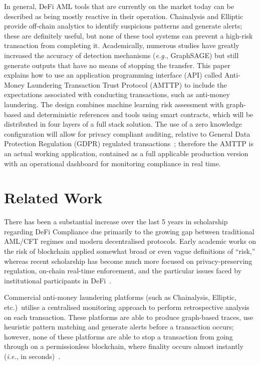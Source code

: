 \documentclass[journal]{IEEEtran}
\newcommand{\ie}{\textit{i.e.}}
\newcommand{\eg}{\textit{e.g.}}
\begin{document}
In general, DeFi AML tools that are currently on the market today can be described as being mostly reactive in their operation. Chainalysis and Elliptic provide off-chain analytics to identify suspicious patterns and generate alerts; these are definitely useful, but none of these tool systems can prevent a high-risk transaction from completing it. Academically, numerous studies have greatly increased the accuracy of detection mechanisms (\eg, GraphSAGE) but still generate outputs that have no means of stopping the transfer. This paper explains how to use an application programming interface (API) called Anti-Money Laundering Transaction Trust Protocol (AMTTP) to include the expectations associated with conducting transactions, such as anti-money laundering. The design combines machine learning risk assessment with graph-based and deterministic references and tools using smart contracts, which will be distributed in four layers of a full stack solution. The use of a zero knowledge configuration will allow for privacy compliant auditing, relative to General Data Protection Regulation (GDPR) regulated transactions~\cite{groth2016}; therefore the AMTTP is an actual working application, contained as a full applicable production version with an operational dashboard for monitoring compliance in real time.

\section{Related Work}

There has been a substantial increase over the last 5 years in scholarship regarding DeFi Compliance due primarily to the growing gap between traditional AML/CFT regimes and modern decentralised protocols. Early academic works on the risk of blockchain applied somewhat broad or even vague definitions of ``risk,'' whereas recent scholarship has become much more focused on privacy-preserving regulation, on-chain real-time enforcement, and the particular issues faced by institutional participants in DeFi~\cite{joseph2025}.

Commercial anti-money laundering platforms (such as Chainalysis, Elliptic, etc.)\ utilise a centralised monitoring approach to perform retrospective analysis on each transaction. These platforms are able to produce graph-based traces, use heuristic pattern matching and generate alerts before a transaction occurs; however, none of these platforms are able to stop a transaction from going through on a permissionless blockchain, where finality occurs almost instantly (\ie, in seconds)~\cite{memgraph2024}.
\end{document}
